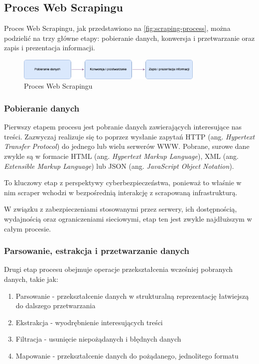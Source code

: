 \subsection{Proces Web Scrapingu}\label{subsec:web-scraping-process}

Proces Web Scrapingu, jak przedstawiono na \autoref{fig:scraping-process}, można podzielić na trzy główne etapy: pobieranie danych, konwersja i przetwarzanie oraz zapis i prezentacja informacji\cite{persson}.

\begin{figure}[H]
    \centering
    \includegraphics[width=0.8\textwidth]{img/scraping-process}
    \caption{Proces Web Scrapingu}
    \label{fig:scraping-process}
\end{figure}

\subsubsection{Pobieranie danych}

Pierwszy etapem procesu jest pobranie danych zawierających interesujące nas treści.
Zazwyczaj realizuje się to poprzez wysłanie zapytań HTTP (ang. \emph{Hypertext Transfer Protocol}) do jednego lub wielu serwerów WWW\@.
Pobrane, surowe dane zwykle są w formacie HTML (ang. \emph{Hypertext Markup Language}), XML (ang. \emph{Extensible Markup Language}) lub JSON (ang. \emph{JavaScript Object Notation}).

To kluczowy etap z perspektywy cyberbezpieczeństwa, ponieważ to właśnie w nim scraper wchodzi w bezpośrednią interakcję z scrapowaną infrastrukturą.

W związku z zabezpieczeniami stosowanymi przez serwery, ich dostępnością, wydajnością oraz ograniczeniami sieciowymi, etap ten jest zwykle najdłuższym w całym procesie.

\subsubsection{Parsowanie, estrakcja i przetwarzanie danych}

Drugi etap procesu obejmuje operacje przekształcenia wcześniej pobranych danych, takie jak:
\begin{enumerate}
    \item Parsowanie - przekształcenie danych w strukturalną reprezentację łatwiejszą do dalszego przetwarzania
    \item Ekstrakcja - wyodrębnienie interesujących treści
    \item Filtracja - usunięcie niepożądanych i błędnych danych
    \item Mapowanie - przekształcenie danych do pożądanego, jednolitego formatu
\end{enumerate}

